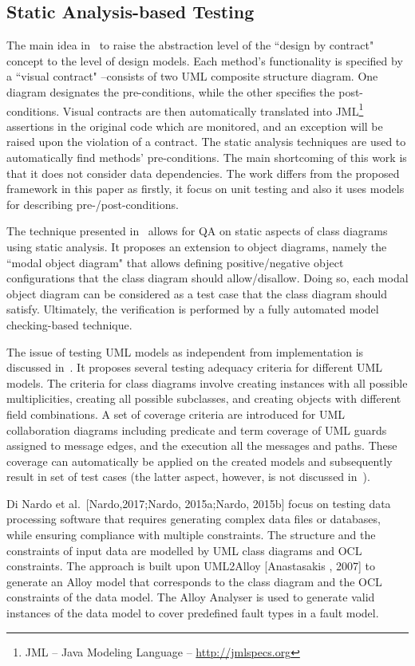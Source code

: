 \subsection{Static Analysis-based Testing}
\label{sec:relate-static-analysis}
The main idea in~\cite{Engels2006} to raise the abstraction level of the ``design by contract"~\cite{Meyer1992} concept to the level of design models. Each method's functionality is specified by a ``visual contract" --consists of two UML composite structure diagram. One diagram designates the pre-conditions, while the other specifies the post-conditions. Visual contracts are then automatically translated into JML\footnote{JML – Java Modeling Language – \url{http://jmlspecs.org}} assertions in the original code which are monitored, and an exception will be raised upon the violation of a contract. The static analysis techniques are used to automatically find methods' pre-conditions. The main shortcoming of this work is that it does not consider data dependencies. The work differs from the proposed framework in this paper as firstly,  it focus on unit testing and also it uses models for describing pre-/post-conditions. 

The technique presented in~\cite{Maoz2011} allows for QA on static aspects of class diagrams using static analysis. It proposes an extension to object diagrams, namely the ``modal object diagram" that allows defining positive/negative object configurations that the class diagram should allow/disallow. Doing so, each modal object diagram can be considered as a test case that the class diagram should satisfy. Ultimately, the verification is performed by a fully automated model checking-based technique.

The issue of testing UML models as independent from implementation is discussed in~\cite{Andrews2003}. It proposes several testing adequacy criteria for different UML models. The criteria for class diagrams involve creating instances with all possible multiplicities, creating all possible subclasses, and creating objects with different field combinations. A set of coverage criteria are introduced for UML collaboration diagrams including predicate and term coverage of UML guards assigned to message edges, and the execution all the messages and paths. These coverage can automatically be applied on the created models and subsequently result in set of test cases (the latter aspect, however, is not discussed in~\cite{Andrews2003}).


Di Nardo et al.~[Nardo,2017;Nardo, 2015a;Nardo, 2015b] focus on testing data processing software that requires generating complex data files or databases, while ensuring compliance with multiple constraints. The structure and the constraints of input data are modelled by UML class diagrams and OCL constraints. The approach is built upon UML2Alloy [Anastasakis , 2007] to generate an Alloy model that corresponds to the class diagram and the OCL constraints of the data model. The Alloy Analyser is used to generate valid instances of the data model to cover predefined fault types in a fault model.

